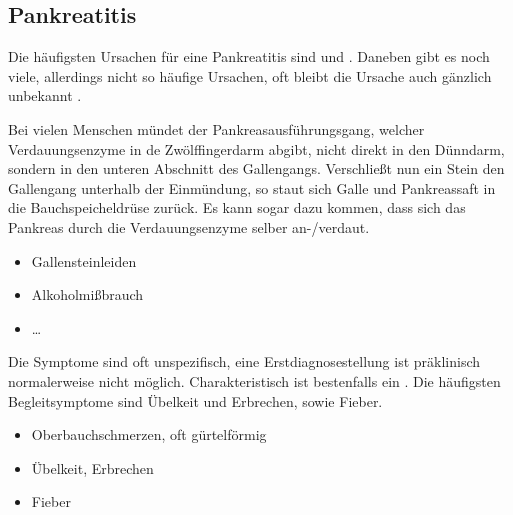 \subsection{Pankreatitis}

\label{topic:pankreatitis}



{%
%
%
%
Die häufigsten Ursachen für eine Pankreatitis sind
 und 
\citep{SiewertChirurgie8-07.14-Pankreas,ScholzNotfallmedizin2}.
Daneben gibt es noch viele, allerdings nicht so häufige
Ursachen, oft bleibt die Ursache auch gänzlich unbekannt
\citep{HeroldInnereMedizin2005}.

 Bei vielen Menschen mündet der
Pankreasausführungsgang, welcher Verdauungsenzyme in de
Zwölffingerdarm abgibt, nicht direkt in den Dünndarm,
sondern in den unteren Abschnitt des Gallengangs.
Verschließt nun ein Stein den Gallengang unterhalb der
Einmündung, so staut sich Galle und Pankreassaft in die
Bauchspeicheldrüse zurück. Es kann sogar dazu kommen, dass
sich das Pankreas durch die Verdauungsenzyme selber
an-/verdaut.

}
{\begin{itemize}
  \item Gallensteinleiden
  \item Alkoholmißbrauch
  \item \ldots
\end{itemize}}
{}
{}
{}

{Die Symptome sind oft unspezifisch, eine
Erstdiagnosestellung ist präklinisch normalerweise nicht
möglich. Charakteristisch ist bestenfalls ein
.
Die häufigsten Begleitsymptome sind Übelkeit und Erbrechen,
sowie Fieber. \citep{HeroldInnereMedizin2005}

\bigskip
}
{\begin{itemize}
  \item Oberbauchschmerzen, oft gürtelförmig
  \item Übelkeit, Erbrechen
  \item Fieber
\end{itemize}}
{}
{}
{}

